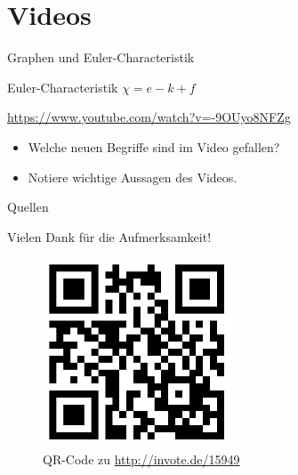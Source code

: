 \documentclass[18pt]{beamer}
\begin{document}
\section{Videos}
    \begin{frame}{Graphen und Euler-Characteristik}
        \begin{block}{Euler-Characteristik}
            \pause
            $\chi = e - k + f$
        \end{block}

        \url{https://www.youtube.com/watch?v=-9OUyo8NFZg}

        \begin{itemize}
            \item Welche neuen Begriffe sind im Video gefallen?
            \item Notiere wichtige Aussagen des Videos.
        \end{itemize}
    \end{frame}

    \appendix
    \beginbackup

    \begin{frame}[allowframebreaks]{Quellen}
    
    \end{frame}

    \backupend

    \begin{frame}{Vielen Dank für die Aufmerksamkeit!}
        \begin{figure}[]
            \centering
            \includegraphics[keepaspectratio, width=0.5\textwidth]{figures/qrcode.png}
            \caption{QR-Code zu \url{http://invote.de/15949}}
        \end{figure}
        
    
    \end{frame}
\end{document}
